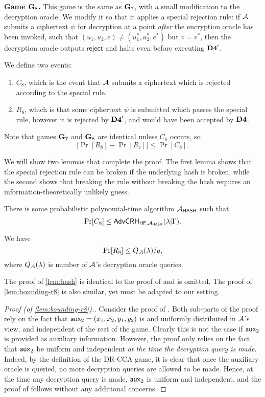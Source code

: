 \textbf{Game $\mathbf{G}_8$.} This game is the same as $\mathbf{G}_7$, with a small modification to the decryption oracle. We modify it so that it applies a special rejection rule: if $\mathcal{A}$ submits a ciphertext $\psi$ for decryption at a point \textit{after} the encryption oracle has been invoked, such that $(u_1, u_2, e)\neq (u_1^{*}, u_2^{*}, e^{*})$ but $v = v^{*}$, then the decryption oracle outputs $\mathsf{reject}$ and halts even before executing $\mathbf{D4}'$.

We define two events:
\begin{enumerate}
	\item $C_8$, which is the event that $\mathcal{A}$ submits a ciphertext which is rejected according to the special rule.
	\item $R_8$, which is that some ciphertext $\psi$ is submitted which passes the special rule, however it is rejected by $\mathbf{D4}'$, and would have been accepted by $\mathbf{D4}$.
\end{enumerate}

Note that games $\mathbf{G}_7$ and $\mathbf{G}_8$ are identical unless $C_8$ occurs, so
$$|\Pr[R_8]-\Pr[R_7]|\leq\Pr[C_8].$$

We will show two lemmas that complete the proof. The first lemma shows that the special rejection rule can be broken if the underlying hash is broken, while the second shows that breaking the rule without breaking the hash requires an information-theoretically unlikely guess.

\begin{lemma}
	\label{lem:hash}
	There is some probabilistic polynomial-time algorithm $\mathcal{A}_\mathsf{HASH}$ such that $$\Pr[C_8]\leq\mathsf{AdvCRH}_{\mathsf{HF},\mathcal{A}_\mathsf{HASH}}(\lambda|\Gamma).$$
\end{lemma}

\begin{lemma}
	\label{lem:bounding-r8}
	We have $$\Pr[R_8]\leq Q_{\mathcal{A}}(\lambda)/q,$$
where $Q_{\mathcal{A}}(\lambda)$ is number of $\mathcal{A}$'s decryption oracle queries.
\end{lemma}
The proof of \cref{lem:hash} is identical to the proof of \cite[Lemma~7]{cs01} and is omitted. The proof of \cref{lem:bounding-r8} is also similar, yet must be adapted to our setting. 

\begin{proof}[Proof (of \cref{lem:bounding-r8}).]
	Consider the proof of \cite[Lemma~8]{cs01}. Both sub-parts of the proof rely on the fact that $\mathsf{aux}_2 = (x_1,x_2,y_1,y_2)$ is and uniformly distributed in $\mathcal{A}$'s view, and independent of the rest of the game. Clearly this is not the case if $\mathsf{aux}_2$ is provided as auxiliary information. However, the proof only relies on the fact that $\mathsf{aux}_2$ be uniform and independent \textit{at the time the decryption query is made}. Indeed, by the definition of the DR-CCA game, it is clear that once the auxiliary oracle is queried, no more decryption queries are allowed to be made. Hence, at the time any decryption query is made, $\mathsf{aux}_2$ is uniform and independent, and the proof of \cite[Lemma~8]{cs01} follows without any additional concerns.
\end{proof}

